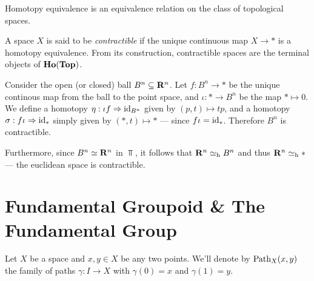 \begin{corollary}
\label{cor:htpy-equiv-is-equiv-relation}
Homotopy equivalence is an equivalence relation on the class of topological
spaces.
\end{corollary}

\begin{definition}
\label{def:contractible-space}
A space \(X\) is said to be \emph{contractible} if the unique continuous map
\(X \to *\) is a homotopy equivalence. From its construction, contractible
spaces are the terminal objects of \({\textbf{Ho}(\textbf{Top})}\).
\end{definition}

\begin{example}
\label{exp:ball-contractible}
Consider the open (or closed) ball \(B^n \subseteq \mathbf{R}^n\). Let \(f: B^n \to *\)
be the unique continous map from the ball to the point space, and
\(\iota: * \to B^n\) be the map \(* \mapsto 0\). We define a homotopy
\(\eta: \iota f \Rightarrow \operatorname{id}_{B^n}\) given by \((p, t) \mapsto t p\), and a homotopy
\(\sigma: f \iota \Rightarrow \operatorname{id}_{*}\) simply given by \((*, t) \mapsto *\) --- since
\(f \iota = \operatorname{id}_{*}\). Therefore \(B^n\) is contractible.

Furthermore, since \(B^n \simeq \mathbf{R}^n\) in \(\Top\), it follows that \(\mathbf{R}^n \simeq_{\text{h}}
B^n\) and thus \(\mathbf{R}^n \simeq_{\text{h}} *\) --- the euclidean space is contractible.
\end{example}

\section{Fundamental Groupoid \& The Fundamental Group}

\begin{notation}
\label{not:family-of-paths}
Let \(X\) be a space and \(x, y \in X\) be any two points. We'll denote by
\(\operatorname{Path}_X(x, y)\) the family of paths \(\gamma: I \to X\) with \(\gamma(0) = x\) and \(\gamma(1) = y\).
\end{notation}

